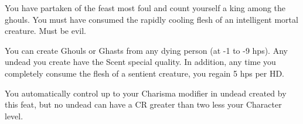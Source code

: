 \shortdescfeat
{You have partaken of the feast most foul and count yourself a king among the ghouls.}
{You must have consumed the rapidly cooling flesh of an intelligent mortal creature. Must be evil.}
{You can create Ghouls or Ghasts from any dying person (at -1 to -9 hps). Any undead you create have the Scent special quality. In addition, any time you completely consume the flesh of a sentient creature, you regain 5 hps per HD.

You automatically control up to your Charisma modifier in undead created by this feat, but no undead can have a CR greater than two less your Character level.}

